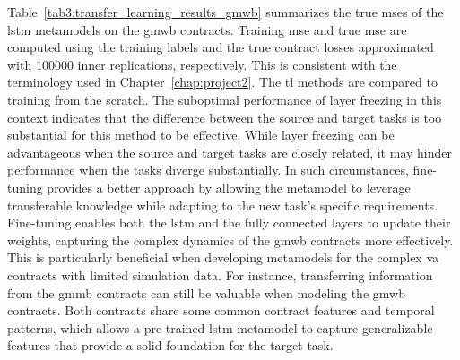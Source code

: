 Table~\ref{tab3:transfer_learning_results_gmwb} summarizes the true \gls{mse}s of the \gls{lstm} metamodels on the \gls{gmwb} contracts.
Training \gls{mse} and true \gls{mse} are computed using the training labels and the true contract losses approximated with $\num{100000}$ inner replications, respectively.
This is consistent with the terminology used in Chapter~\ref{chap:project2}.
The \gls{tl} methods are compared to training from the scratch.
The suboptimal performance of layer freezing in this context indicates that the difference between the source and target tasks is too substantial for this method to be effective. 
While layer freezing can be advantageous when the source and target tasks are closely related, it may hinder performance when the tasks diverge substantially.
In such circumstances, fine-tuning provides a better approach by allowing the metamodel to leverage transferable knowledge while adapting to the new task's specific requirements. 
Fine-tuning enables both the \gls{lstm} and the fully connected layers to update their weights, capturing the complex dynamics of the \gls{gmwb} contracts more effectively.
This is particularly beneficial when developing metamodels for the complex \gls{va} contracts with limited simulation data. 
For instance, transferring information from the \gls{gmmb} contracts can still be valuable when modeling the \gls{gmwb} contracts.
Both contracts share some common contract features and temporal patterns, which allows a pre-trained \gls{lstm} metamodel to capture generalizable features that provide a solid foundation for the target task.

